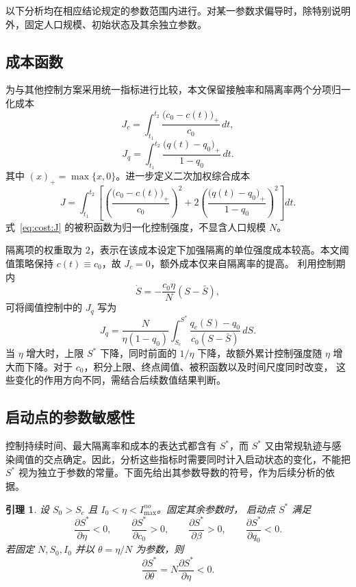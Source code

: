 \documentclass[UTF8,a4paper,10pt,fontset=fandol]{ctexart}
\theoremstyle{cnplain}
\newtheorem{lemma}[theorem]{引理}
\theoremstyle{remark}
\numberwithin{equation}{section}
\begin{document}
以下分析均在相应结论规定的参数范围内进行。对某一参数求偏导时，除特别说明外，固定人口规模、初始状态及其余独立参数。

\subsection{成本函数}

为与其他控制方案采用统一指标进行比较，本文保留接触率和隔离率两个分项归一化成本
\begin{equation}
J_c=\int_{t_1}^{t_2} \frac{\bigl(c_0-c(t)\bigr)_+}{c_0}\,dt,
\end{equation}
\begin{equation}
J_q=\int_{t_1}^{t_2} \frac{\bigl(q(t)-q_0\bigr)_+}{1-q_0}\,dt.
\end{equation}
其中 $(x)_+=\max\{x,0\}$。进一步定义二次加权综合成本
\begin{equation}
J
=
\int_{t_1}^{t_2}
\left[
\left(\frac{\bigl(c_0-c(t)\bigr)_+}{c_0}\right)^2
+
2\left(\frac{\bigl(q(t)-q_0\bigr)_+}{1-q_0}\right)^2
\right]dt.
\label{eq:cost:J}
\end{equation}
式~\eqref{eq:cost:J} 的被积函数为归一化控制强度，不显含人口规模 $N$。

隔离项的权重取为 $2$，表示在该成本设定下加强隔离的单位强度成本较高。本文阈值策略保持 $c(t)\equiv c_0$，故 $J_c=0$，额外成本仅来自隔离率的提高。
利用控制期内
\[
\dot S=-\frac{c_0\eta}{N}(S-\bar S),
\]
可将阈值控制中的 $J_q$ 写为
\begin{equation}
J_q
=
\frac{N}{\eta(1-q_0)}
\int_{S_c}^{S^*}
\frac{q_c(S)-q_0}{c_0(S-\bar S)}\,dS.
\end{equation}
当 $\eta$ 增大时，上限 $S^*$ 下降，同时前面的 $1/\eta$ 下降，故额外累计控制强度随
$\eta$ 增大而下降。对于 $c_0$，积分上限、终点阈值、被积函数以及时间尺度同时改变，
这些变化的作用方向不同，需结合后续数值结果判断。


\subsection{启动点的参数敏感性}
控制持续时间、最大隔离率和成本的表达式都含有 $S^*$，而 $S^*$ 又由常规轨迹与感染阈值的交点确定。因此，分析这些指标时需要同时计入启动状态的变化，不能把 $S^*$ 视为独立于参数的常量。下面先给出其参数导数的符号，作为后续分析的依据。

\begin{lemma}
\label{lem:s1:Sstar-sensitivity}
设 $S_0>S_c$ 且 $I_0<\eta<I_{\max}^{no}$。固定其余参数时，
启动点 $S^*$ 满足
\[
\frac{\partial S^*}{\partial \eta}<0,
\qquad
\frac{\partial S^*}{\partial c_0}>0,
\qquad
\frac{\partial S^*}{\partial \beta}>0,
\qquad
\frac{\partial S^*}{\partial q_0}<0.
\]
若固定 $N,S_0,I_0$ 并以 $\theta=\eta/N$ 为参数，则
\[
\frac{\partial S^*}{\partial \theta}=N\frac{\partial S^*}{\partial \eta}<0.
\]
\end{lemma}
\end{document}
